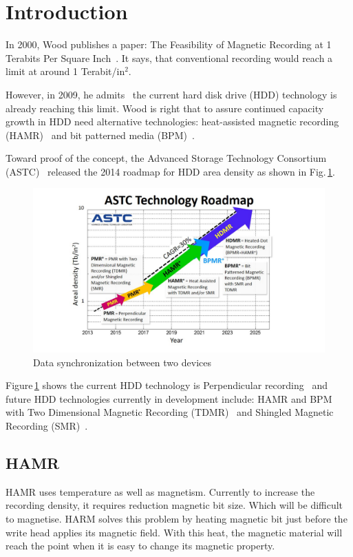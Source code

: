 \section{Introduction}
In 2000, Wood publishes a paper: The Feasibility of Magnetic Recording at 1 Terabits Per Square Inch~\cite{Wood2000}. It says, that conventional recording would reach a limit at around 1 Terabit/in$^2$.

However, in 2009, he admits~\cite{Wood2009} the current hard disk drive (HDD) technology is already reaching this limit. Wood is right that to assure continued capacity growth in HDD need alternative technologies: heat-assisted magnetic recording (HAMR)~\cite{Rottmeyer} and bit patterned media (BPM)~\cite{Terris}. 

Toward proof of the concept, the Advanced Storage Technology Consortium (ASTC)~\cite{ASTC} released the 2014 roadmap for HDD area density as shown in Fig.\,\ref{fig_astc}.

\begin{figure}[!hbt]
\includegraphics[height=0.25\textheight]{ASTC}
\caption{Data synchronization between two devices}
\label{fig_astc}
\end{figure}

Figure\,\ref{fig_astc} shows the current HDD technology is Perpendicular recording~\cite{HGST} and future HDD technologies currently in development include: HAMR and BPM with Two Dimensional Magnetic Recording (TDMR)~\cite{Krishnan} and Shingled Magnetic Recording (SMR)~\cite{Gibson}.

\subsection{HAMR} 
HAMR uses temperature as well as magnetism. Currently to increase the recording density, it requires reduction magnetic bit size. Which will be difficult to magnetise. HARM solves this problem by heating magnetic bit just before the write head applies its magnetic field. With this heat, the magnetic material will reach the point when it is easy to change its magnetic property.

